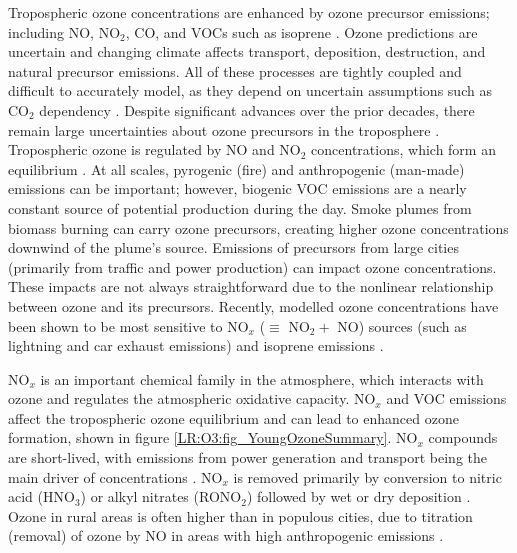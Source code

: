     
    Tropospheric ozone concentrations are enhanced by ozone precursor 
    emissions; including NO, NO$_2$, CO, and VOCs such as isoprene 
    \parencite{Atkinson2000, Young2013, Marvin2017}.
    Ozone predictions are uncertain and changing climate affects transport, 
    deposition, destruction, and natural precursor emissions.
    All of these processes are tightly coupled and difficult to accurately 
    model, as they depend on uncertain assumptions such as CO$_2$ dependency 
    \parencite{Young2013}.
    Despite significant advances over the prior decades, there remain large 
    uncertainties about ozone precursors in the troposphere 
    \parencite{Mazzuca2016}.
    Tropospheric ozone is regulated by NO and NO$_2$ concentrations, which form 
    an equilibrium \parencite{Cape2008, Young2018}.
    At all scales, pyrogenic (fire) and anthropogenic (man-made) emissions can 
    be important; however, biogenic VOC emissions are a nearly constant source 
    of potential production during the day.
    Smoke plumes from biomass burning can carry ozone precursors, creating 
    higher ozone concentrations downwind of the plume's source.
    Emissions of precursors from large cities (primarily from traffic and power 
    production) can impact ozone concentrations.
    These impacts are not always straightforward due to the nonlinear 
    relationship between ozone and its precursors.
    Recently, modelled ozone concentrations have been shown to be most 
    sensitive to NO$_x$ ($\equiv $ NO$_2 +$ NO) sources (such as lightning and 
    car exhaust emissions) and isoprene emissions \parencite{Christian2018}.
    
    NO$_x$ is an important chemical family in the atmosphere, which interacts 
    with ozone and regulates the atmospheric oxidative capacity.
    NO$_x$ and VOC emissions affect the tropospheric ozone equilibrium and can 
    lead to enhanced ozone formation, shown in figure 
    \ref{LR:O3:fig_YoungOzoneSummary}.
    NO$_x$ compounds are short-lived, with emissions from power generation and 
    transport being the main driver of concentrations \parencite{Delmas1997}.
    NO$_x$ is removed primarily by conversion to nitric acid (HNO$_3$) or alkyl 
    nitrates (RONO$_2$) followed by wet or dry deposition 
    \parencite{Ayers2006, Present2019}.
    Ozone in rural areas is often higher than in populous cities, due to 
    titration (removal) of ozone by NO in areas with high anthropogenic 
    emissions \parencite{Cooper2014, Monks2015}.
    
